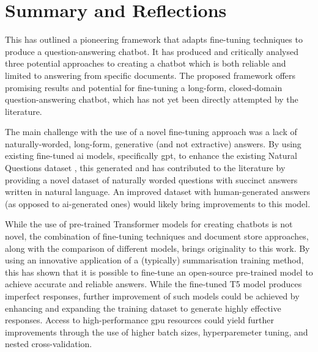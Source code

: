 \chapter{Summary and Reflections}\label{ch:summary}
This \papertype has outlined a pioneering framework that adapts fine-tuning techniques to produce a question-answering chatbot. It has produced and critically analysed three potential approaches to creating a chatbot which is both reliable and limited to answering from specific documents. The proposed framework offers promising results and potential for fine-tuning a long-form, closed-domain question-answering chatbot, which has not yet been directly attempted by the literature. 

The main challenge with the use of a novel fine-tuning approach was a lack of naturally-worded, long-form, generative (and not extractive) answers. By using existing fine-tuned \acrlong{ai} models, specifically \acrshort{gpt}, to enhance the existing Natural Questions dataset \citep{NQdataset}, this \papertype generated and has contributed to the literature by providing a novel dataset of naturally worded questions with succinct answers written in natural language. An improved dataset with human-generated answers (as opposed to \acrshort{ai}-generated ones) would likely bring improvements to this model.

While the use of pre-trained Transformer models for creating chatbots is not novel, the combination of fine-tuning techniques and document store approaches, along with the comparison of different models, brings originality to this work. By using an innovative application of a (typically) summarisation training method, this \papertype has shown that it is possible to fine-tune an open-source pre-trained model to achieve accurate and reliable answers. While the fine-tuned T5 model produces imperfect responses, further improvement of such models could be achieved by enhancing and expanding the training dataset to generate highly effective responses. Access to high-performance \acrshort{gpu} resources could yield further improvements through the use of higher batch sizes, hyperparemeter tuning, and nested cross-validation.

